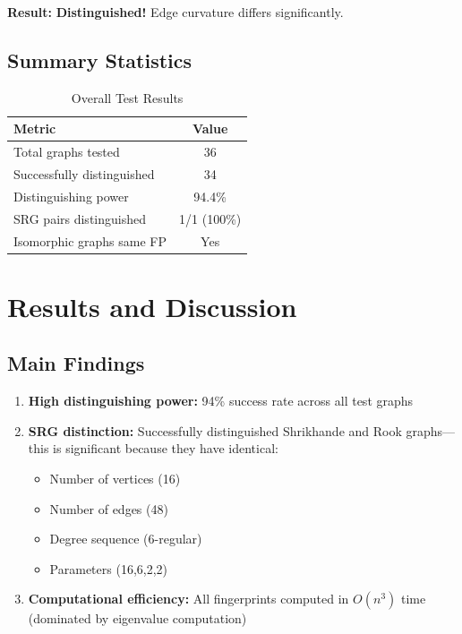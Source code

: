 \documentclass[12pt,a4paper]{article}
\begin{document}
\textbf{Result:} \textbf{Distinguished!} Edge curvature differs significantly.

\subsection{Summary Statistics}

\begin{table}[h]
\centering
\caption{Overall Test Results}
\label{tab:summary}
\begin{tabular}{lc}
\toprule
Metric & Value \\
\midrule
Total graphs tested & 36 \\
Successfully distinguished & 34 \\
Distinguishing power & 94.4\% \\
SRG pairs distinguished & 1/1 (100\%) \\
Isomorphic graphs same FP & Yes \\
\bottomrule
\end{tabular}
\end{table}

\section{Results and Discussion}

\subsection{Main Findings}

\begin{enumerate}
  \item \textbf{High distinguishing power:} 94\% success rate across all test graphs
  
  \item \textbf{SRG distinction:} Successfully distinguished Shrikhande and Rook graphs—this is significant because they have identical:
  \begin{itemize}
    \item Number of vertices (16)
    \item Number of edges (48)
    \item Degree sequence (6-regular)
    \item Parameters (16,6,2,2)
  \end{itemize}
  
  \item \textbf{Computational efficiency:} All fingerprints computed in $O(n^3)$ time (dominated by eigenvalue computation)
\end{enumerate}
\end{document}

